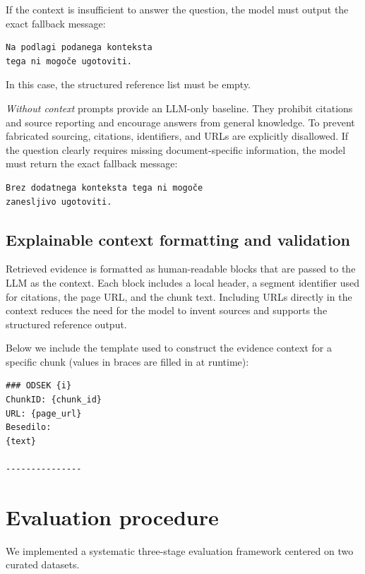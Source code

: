 \documentclass[conference]{IEEEtran}
\begin{document}
If the context is insufficient to answer the question, the model must output the exact fallback message:

\begin{verbatim}
Na podlagi podanega konteksta 
tega ni mogoče ugotoviti.
\end{verbatim}

In this case, the structured reference list must be empty.

\textit{Without context} prompts provide an LLM-only baseline. They prohibit citations and source reporting and encourage answers from general knowledge. To prevent fabricated sourcing, citations, identifiers, and URLs are explicitly disallowed. If the question clearly requires missing document-specific information, the model must return the exact fallback message:

\begin{verbatim}
Brez dodatnega konteksta tega ni mogoče 
zanesljivo ugotoviti.
\end{verbatim}

\subsection{Explainable context formatting and validation}
Retrieved evidence is formatted as human-readable blocks that are passed to the LLM as the context. Each block includes a local header, a segment identifier used for citations, the page URL, and the chunk text. Including URLs directly in the context reduces the need for the model to invent sources and supports
the structured reference output.

Below we include the template used to construct the evidence context for a specific chunk (values in braces are filled in at runtime):

\begin{verbatim}
### ODSEK {i}
ChunkID: {chunk_id}
URL: {page_url}
Besedilo:
{text}

---------------
\end{verbatim}

\section{Evaluation procedure}

We implemented a systematic three-stage evaluation framework centered on two curated datasets.
\end{document}
